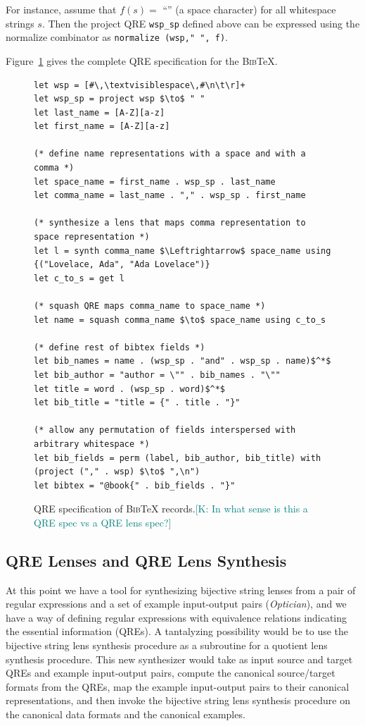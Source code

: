 \documentclass[acmsmall,review,anonymous]{acmart}
\newcommand{\FINISH}[3]{\ifdraft\textcolor{#1}{[#2: #3]}\fi}
\newcommand{\ksf}[1]{\FINISH{teal}{K}{#1}}
\newcommand{\bibtex}{\textsc{Bib}\TeX{}}
\begin{document}
For instance, assume that $f(s)=$ ``\textvisiblespace'' (a space
character) for all whitespace strings $s$. Then the 
project QRE \lstinline{wsp_sp} defined above can
be expressed using the normalize combinator as
\lstinline{normalize (wsp," ", f)}.

Figure~\ref{fig:example-qre} gives the complete QRE specification for the
\bibtex{}.
\begin{figure}
\begin{lstlisting}
let wsp = [#\,\textvisiblespace\,#\n\t\r]+
let wsp_sp = project wsp $\to$ " "
let last_name = [A-Z][a-z]
let first_name = [A-Z][a-z]

(* define name representations with a space and with a comma *)
let space_name = first_name . wsp_sp . last_name
let comma_name = last_name . "," . wsp_sp . first_name

(* synthesize a lens that maps comma representation to space representation *)
let l = synth comma_name $\Leftrightarrow$ space_name using {("Lovelace, Ada", "Ada Lovelace")}
let c_to_s = get l

(* squash QRE maps comma_name to space_name *)
let name = squash comma_name $\to$ space_name using c_to_s

(* define rest of bibtex fields *)
let bib_names = name . (wsp_sp . "and" . wsp_sp . name)$^*$
let bib_author = "author = \"" . bib_names . "\""
let title = word . (wsp_sp . word)$^*$
let bib_title = "title = {" . title . "}"

(* allow any permutation of fields interspersed with arbitrary whitespace *)
let bib_fields = perm (label, bib_author, bib_title) with (project ("," . wsp) $\to$ ",\n")
let bibtex = "@book{" . bib_fields . "}"
\end{lstlisting}
\caption{QRE specification of \bibtex{} records.\ksf{In what sense is this a QRE
spec vs a QRE lens spec?}}
\label{fig:example-qre}
\end{figure}


\subsection{QRE Lenses and QRE Lens Synthesis}
\label{sec:examplesynth}
At this point we have a tool for synthesizing bijective string lenses from a
pair of regular expressions and a set of example input-output pairs
({\em Optician}), 
and we have a way of defining regular expressions with equivalence
relations indicating the essential information (QREs).
A tantalyzing possibility would be to use the bijective string lens
synthesis procedure as a subroutine for a quotient lens synthesis procedure. 
This new synthesizer would take as input source and target QREs and 
example input-output pairs, 
compute the canonical source/target formats from the QREs, 
map the example input-output pairs to their canonical representations,
and then invoke the bijective string lens synthesis procedure on the canonical data
formats and the canonical examples.
\end{document}
